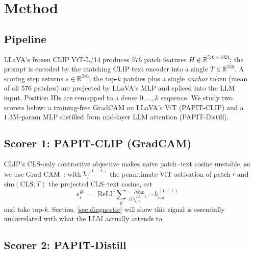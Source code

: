 \documentclass[10pt,twocolumn,letterpaper]{article}
\begin{document}
\section{Method}
\label{sec:method}

\subsection{Pipeline}
\label{sec:method-pipeline}

LLaVA's frozen CLIP ViT-L/14 produces $576$ patch features
$H{\in}\mathbb{R}^{576\times1024}$; the prompt is encoded by the
matching CLIP text encoder into a single $T{\in}\mathbb{R}^{768}$.
A scoring step returns $s{\in}\mathbb{R}^{576}$; the top-$k$ patches
plus a single \emph{anchor} token (mean of all $576$ patches) are
projected by LLaVA's MLP and spliced into the LLM input.
Position IDs are remapped to a dense $0,\dots,k$ sequence. We study
two scorers below: a training-free GradCAM on LLaVA's ViT
(PAPIT-CLIP) and a $1.3$M-param MLP distilled from mid-layer LLM
attention (PAPIT-Distill).

\subsection{Scorer 1: PAPIT-CLIP (GradCAM)}
\label{sec:method-grad}

CLIP's CLS-only contrastive objective makes naive patch--text cosine
unstable, so we use Grad-CAM~\cite{selvaraju2017gradcam}: with
$h^{(L-1)}_i$ the penultimate-ViT activation of patch $i$ and
$\text{sim}(\text{CLS},T)$ the projected CLS--text cosine, set
\begin{equation}
  s^{\text{gc}}_i \;=\; \mathrm{ReLU}\!\sum_{d}\,
    \tfrac{\partial\,\text{sim}}{\partial\, h^{(L-1)}_{i,d}}\!\cdot\! h^{(L-1)}_{i,d}
  \label{eq:gradcam}
\end{equation}
and take top-$k$. Section~\ref{sec:diagnostic} will show this
signal is essentially uncorrelated with what the LLM actually
attends to.

\subsection{Scorer 2: PAPIT-Distill}
\label{sec:method-distill}
\end{document}
